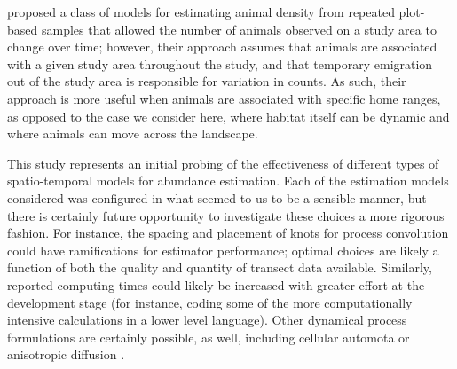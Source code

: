 \documentclass[times,mee,doublespace,]{besauth2}
\begin{document}
\citet{ChandlerEtAl2011} proposed a class of models for estimating animal density from repeated plot-based samples that allowed the number of animals observed on a study area to change over time; however, their approach assumes that animals are associated with a given study area throughout the study, and that temporary emigration out of the study area is responsible for variation in counts.  As such, their approach is more useful when animals are associated with specific home ranges, as opposed to the case we consider here, where habitat itself can be dynamic and where animals can move across the landscape.

This study represents an initial probing of the effectiveness of different types of spatio-temporal models for abundance estimation.  Each of the estimation models considered was configured in what seemed to us to be a sensible manner, but there is certainly future opportunity to investigate these choices a more rigorous fashion.  For instance, the spacing and placement of knots for process convolution could have ramifications for estimator performance; optimal choices are likely a function of both the quality and quantity of transect data available.  Similarly, reported computing times could likely be increased with greater effort at the development stage (for instance, coding some of the more computationally intensive calculations in a lower level language).  Other dynamical process formulations are certainly possible, as well, including cellular automota \citep{HootenWikle2010} or anisotropic diffusion \citep[see e.g.][]{WikleEtAl2001}.






\pagebreak
\end{document}
